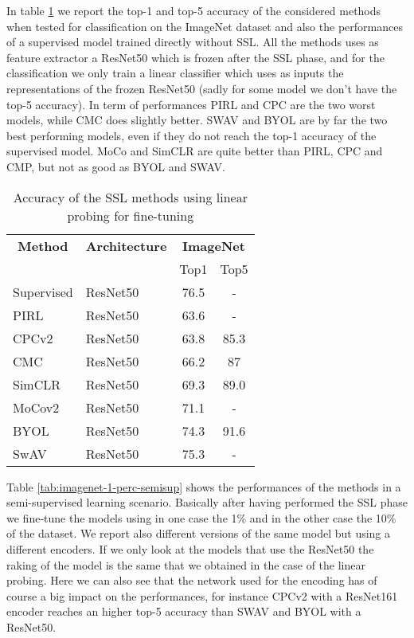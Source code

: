 \noindent In table \ref{tab:imagenet-top1-5-acc-comp} we report the top-1 and top-5 accuracy of the considered methods when tested for classification on the ImageNet dataset and also the performances of a supervised model trained directly without SSL.  All the methods uses as feature extractor a ResNet50 which is frozen after the SSL phase, and for the classification we only train a linear classifier which uses as inputs the representations of the frozen ResNet50 (sadly for some model we don't have the top-5 accuracy). In term of performances PIRL and CPC are the two worst models, while CMC does slightly better. SWAV and BYOL are by far the two best performing models, even if they do not reach the top-1 accuracy of the supervised model. MoCo and SimCLR are quite better than PIRL, CPC and CMP, but not as good as BYOL and SWAV.
\begin{table}[H]
	\centering
	\begin{tabular}{|l|l|cc|}
		\hline
		\multicolumn{1}{|c|}{\textbf{Method}} & \textbf{Architecture} & \multicolumn{2}{c|}{\textbf{ImageNet}} \\
		\multicolumn{1}{|c|}{} &  & Top1 & Top5 \\
		\hline
		Supervised & ResNet50 & 76.5 & - \\
		\hline
		PIRL & ResNet50 & 63.6 & - \\
		CPCv2 & ResNet50 & 63.8 & 85.3 \\
		CMC & ResNet50  & 66.2 & 87 \\
		SimCLR & ResNet50 & 69.3 & 89.0 \\
		MoCov2 & ResNet50 & 71.1 & - \\
		BYOL & ResNet50  & 74.3 & 91.6 \\ 
		SwAV & ResNet50 & 75.3 & - \\
		\hline
\end{tabular}
	\caption{Accuracy of the SSL methods using linear probing for fine-tuning}
	\label{tab:imagenet-top1-5-acc-comp}
\end{table}
\noindent Table \ref{tab:imagenet-1-perc-semisup} shows the performances of the methods in a semi-supervised learning scenario. Basically after having performed the SSL phase we fine-tune the models using in one case the 1\% and in the other case the 10\% of the dataset. We report also different versions of the same model but using a different encoders. If we only look at the models that use the ResNet50 the raking of the model is the same that we obtained in the case of the linear probing. Here we can also see that the network used for the encoding has of course a big impact on the performances, for instance CPCv2 with a ResNet161 encoder reaches an higher top-5 accuracy than SWAV and BYOL with a ResNet50.
